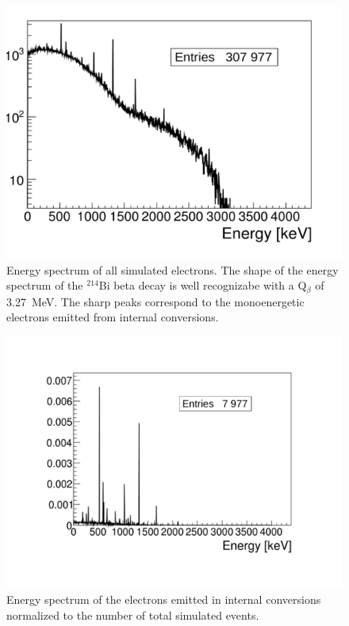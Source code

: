 \documentclass[main.tex]{subfiles}
\begin{document}
\begin{figure}[h!]
\begin{center}
\includegraphics[scale=0.32]{pictures/Chap5/energy_spectrum_all_electron.pdf}
\caption{Energy spectrum of all simulated electrons. The shape of the energy spectrum of the $^{214}$Bi beta decay is well recognizabe with a Q$_\beta$ of 3.27~MeV. The sharp peaks correspond to the monoenergetic electrons emitted from internal conversions.}
\label{energyspectrumallelectron}
\end{center}
\end{figure}


\begin{figure}[h!]
\begin{center}
\includegraphics[scale=0.43]{pictures/Chap5/energy_spectrum_internal_conversion.pdf}
\caption{Energy spectrum of the electrons emitted in internal conversions normalized to the number of total simulated events.}
\label{energyspectruminternalconversion}
\end{center}
\end{figure}
\end{document}
